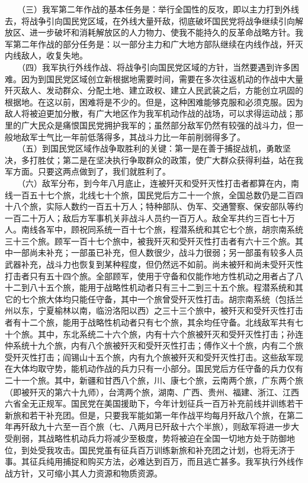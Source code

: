 \documentclass[cn,11pt,chinese]{elegantbook}
\begin{document}
　　（三）我军第二年作战的基本任务是：举行全国性的反攻，即以主力打到外线去，将战争引向国民党区域，在外线大量歼敌，彻底破坏国民党将战争继续引向解放区、进一步破坏和消耗解放区的人力物力、使我不能持久的反革命战略方针。我军第二年作战的部分任务是：以一部分主力和广大地方部队继续在内线作战，歼灭内线敌人，收复失地。\\
　　（四）我军执行外线作战、将战争引向国民党区域的方针，当然要遇到许多困难。因为到国民党区域创立新根据地需要时间，需要在多次往返机动的作战中大量歼灭敌人、发动群众、分配土地、建立政权、建立人民武装之后，方能创立巩固的根据地。在这以前，困难将是不少的。但是，这种困难能够克服和必须克服。因为敌人将被迫更加分散，有广大地区作为我军机动作战的战场，可以求得运动战；那里的广大民众是痛恨国民党拥护我军的；虽然部分敌军仍然有较强的战斗力，但一般地敌军士气比一年前低落得多，其战斗力比一年前削弱得多了。\\
　　（五）到国民党区域作战争取胜利的关键：第一是在善于捕捉战机，勇敢坚决，多打胜仗；第二是在坚决执行争取群众的政策，使广大群众获得利益，站在我军方面。只要这两点做到了，我们就胜利了。\\
　　（六）敌军分布，到今年八月底止，连被歼灭和受歼灭性打击者都算在内，南线一百五十七个旅，北线七十个旅，国民党后方二十一个旅，全国总数仍是二百四十八个旅，实际人数约一百五十万人；特种部队、伪军、交通警察、保安部队等约一百二十万人；敌后方军事机关非战斗人员约一百万人。敌全军共约三百七十万人。南线各军中，顾祝同系统一百十七个旅，程潜系统和其它七个旅，胡宗南系统三十三个旅。顾军一百十七个旅中，被我歼灭和受歼灭性打击者有六十三个旅。其中一部尚未补充；一部虽已补充，但人数很少，战斗力很弱；另一部虽有较多人员武器补充，战斗力也恢复到某种程度，但仍然远不如前。尚未被歼和尚未受歼灭性打击者只有五十四个旅。全部顾军，使用于守备和仅能作地方性机动之用者占了八十二到八十五个旅，能用于战略性机动者只有三十二到三十五个旅。程潜系统和其它的七个旅大体均只能任守备，其中一个旅曾受歼灭性打击。胡宗南系统（包括兰州以东，宁夏榆林以南，临汾洛阳以西）之三十三个旅中，被歼灭和受歼灭性打击者有十二个旅，能用于战略性机动者只有七个旅，其余均任守备。北线敌军共有七十个旅。其中，东北系统二十六个旅，内有十六个旅被歼灭和受歼灭性打击；孙连仲系统十九个旅，内有八个旅被歼灭和受歼灭性打击；傅作义十个旅，内有二个旅受歼灭性打击；阎锡山十五个旅，内有九个旅被歼灭和受歼灭性打击。这些敌军现在大体均取守势，能机动作战的兵力只有一小部分。国民党后方任守备的兵力仅有二十一个旅。其中，新疆和甘西八个旅，川、康七个旅，云南两个旅，广东两个旅（即被歼灭的第六十九师），台湾两个旅，湖南、广西、贵州、福建、浙江、江西六省全无正规军。国民党在美国援助下，今年计划征兵一百万补充前线并训练若干新旅和若干补充团。但是，只要我军能如第一年作战平均每月歼敌八个旅，在第二年再歼敌九十六至一百个旅（七、八两月已歼敌十六个半旅），则敌军将进一步大受削弱，其战略性机动兵力将减少至极度，势将被迫在全国一切地方处于防御地位，到处受我攻击。国民党虽有征兵百万训练新旅和补充团之计划，也将无济于事。其征兵纯用捕捉和购买方法，必难达到百万，而且逃亡甚多。我军执行外线作战方针，又可缩小其人力资源和物质资源。\\
\end{document}
